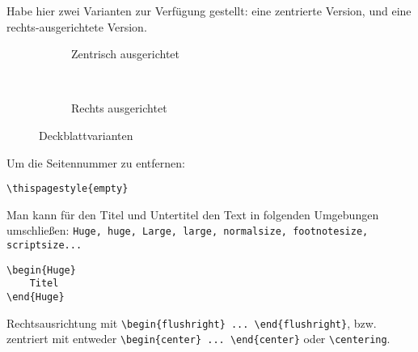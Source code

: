 Habe hier zwei Varianten zur Verfügung gestellt:
eine zentrierte Version, und eine rechts-ausgerichtete Version.

\begin{figure}[H]
	\centering
	\begin{subfigure}{0.45\textwidth}
		\centering
		\caption{Zentrisch ausgerichtet}
	\end{subfigure}
	~
	\begin{subfigure}{0.45\textwidth}
		\centering
		\caption{Rechts ausgerichtet}
	\end{subfigure}
	\caption{Deckblattvarianten}
\end{figure}

Um die Seitennummer zu entfernen:
\begin{verbatim}
\thispagestyle{empty}	
\end{verbatim}

Man kann für den Titel und Untertitel den Text in folgenden
Umgebungen umschließen:
\verb|Huge, huge, Large, large, normalsize, footnotesize, scriptsize...|	
\begin{verbatim}
\begin{Huge}
	Titel
\end{Huge}
\end{verbatim}


Rechtsausrichtung mit \verb|\begin{flushright} ... \end{flushright}|,
bzw. zentriert mit entweder \verb|\begin{center} ... \end{center}|
oder \verb|\centering|.